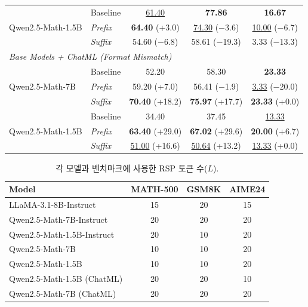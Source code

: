 \begin{table}[ht]
\begin{tabular}{ll ccc}
\midrule
\multirow{3}{*}{Qwen2.5-Math-1.5B} & Baseline & \underline{61.40} & \textbf{77.86} & \textbf{16.67} \\
 & \emph{Prefix} & \textbf{64.40} {\scriptsize(+3.0)} & \underline{74.30} {\scriptsize($-$3.6)} & \underline{10.00} {\scriptsize($-$6.7)} \\
 & \emph{Suffix} & 54.60 {\scriptsize($-$6.8)} & 58.61 {\scriptsize($-$19.3)} & 3.33 {\scriptsize($-$13.3)} \\
\midrule
\multicolumn{5}{l}{\textit{Base Models + ChatML (Format Mismatch)}} \\
\midrule
\multirow{3}{*}{Qwen2.5-Math-7B} & Baseline & 52.20 & 58.30 & \textbf{23.33} \\
 & \emph{Prefix} & 59.20 {\scriptsize(+7.0)} & 56.41 {\scriptsize($-$1.9)} & \underline{3.33} {\scriptsize($-$20.0)} \\
 & \emph{Suffix} & \textbf{70.40} {\scriptsize(+18.2)} & \textbf{75.97} {\scriptsize(+17.7)} & \textbf{23.33} {\scriptsize(+0.0)} \\
\midrule
\multirow{3}{*}{Qwen2.5-Math-1.5B} & Baseline & 34.40 & 37.45 & \underline{13.33} \\
 & \emph{Prefix} & \textbf{63.40} {\scriptsize(+29.0)} & \textbf{67.02} {\scriptsize(+29.6)} & \textbf{20.00} {\scriptsize(+6.7)} \\
 & \emph{Suffix} & \underline{51.00} {\scriptsize(+16.6)} & \underline{50.64} {\scriptsize(+13.2)} & \underline{13.33} {\scriptsize(+0.0)} \\
\bottomrule
\end{tabular}
\end{table}

\begin{table}[ht]
\centering
\caption{각 모델과 벤치마크에 사용한 RSP 토큰 수($L$).}
\label{tab:token_count}
\footnotesize
\renewcommand{\arraystretch}{0.9}
\begin{tabular}{lccc}
\toprule
\textbf{Model} & \textbf{MATH-500} & \textbf{GSM8K} & \textbf{AIME24} \\
\midrule
LLaMA-3.1-8B-Instruct & 15 & 20 & 15 \\
Qwen2.5-Math-7B-Instruct & 20 & 20 & 20 \\
Qwen2.5-Math-1.5B-Instruct & 20 & 10 & 20 \\
Qwen2.5-Math-7B & 10 & 10 & 20 \\
Qwen2.5-Math-1.5B & 10 & 10 & 20 \\
Qwen2.5-Math-1.5B (ChatML) & 20 & 20 & 10 \\
Qwen2.5-Math-7B (ChatML) & 20 & 20 & 20 \\
\bottomrule
\end{tabular}
\end{table}

